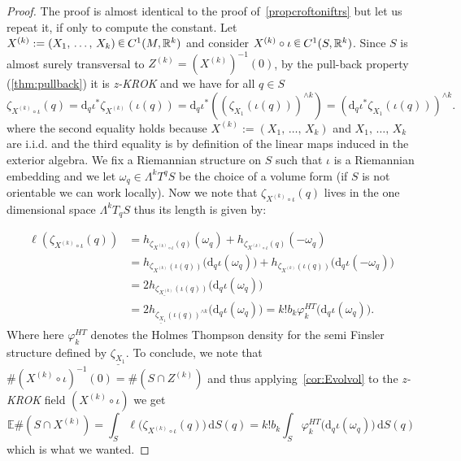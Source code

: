 \documentclass[10pt]{amsart}
\theoremstyle{definition}\newtheorem{defi}[theo]{Definition}\newtheorem{rema}[theo]{Remark}\newtheorem{exam}[theo]{Example}\newtheorem{exem}[theo]{Example}\newtheorem{nota}[theo]{Notation}
\newcommand{\R}{\mathbb{R}}
\newcommand{\EE}{\mathbb{E}}
\newcommand{\dd}{\mathrm{d}}
\newcommand{\seg}{\underline}
\newcommand{\zkrok}{\emph{z-KROK}\xspace}
\newcommand*\randin{
\mathchoice {\raisebox{-.35ex}{$\displaystyle{^\subset}$}\mkern-11.5mu\raisebox{+.45ex}{$\displaystyle{_\subset}$}} {\mkern+1mu\raisebox{-.27ex}{$\textstyle{^\subset}$}\mkern-11.7mu\raisebox{+.45ex}{$\textstyle{_\subset}$}} {\raisebox{.35ex}{$\scriptstyle\subset$}\mkern-14mu\raisebox{-.15ex}{$\scriptstyle\subset$}} {\raisebox{.3ex}{$\scriptscriptstyle\subset$}\mkern-13.5mu\raisebox{-.10ex}{$\scriptscriptstyle\subset$}}}
\begin{document}
\begin{proof}
The proof is almost identical to the proof of~\cref{propcroftoniftrs} but let us repeat it, if only to compute the constant. Let $X^{(k)}:=(X_1,\,\ldots,\,X_k)\,\randin\, C^1(M,\R^k)$ and consider $X^{(k)}\circ \iota\,\randin\, C^1(S,\R^k)$. Since $S$ is almost surely transversal to $Z^{(k)}=(X^{(k)})^{-1}(0)$, by the pull-back property (\cref{thm:pullback}) it is \zkrok and we have for all $q\in S$
\begin{equation*}
\zeta_{X^{(k)}\circ \iota}(q)=\dd_q\iota^* \zeta_{X^{(k)}}(\iota(q))=\dd_q\iota^* \left((\zeta_{X_1}(\iota(q)))^{\wedge k}\right)=\left(\dd_q\iota^* \zeta_{X_1}(\iota(q))\right)^{\wedge k}.
\end{equation*}
where the second equality holds because $X^{(k)}:=(X_1,\,\ldots,\,X_k)$ and $X_1,\,\ldots,\,X_k$ are i.i.d. and the third equality is by definition of the linear maps induced in the exterior algebra. We fix a Riemannian structure on $S$ such that $\iota$ is a Riemannian embedding and we let $\omega_q\in \Lambda^kT^qS$ be the choice of a volume form (if $S$ is not orientable we can work locally). Now we note that $\zeta_{X^{(k)}\circ \iota}(q)$ lives in the one dimensional space $\Lambda^kT_qS$ thus its length is given by:

\begin{align*}
\ell\left(\zeta_{X^{(k)}\circ\iota}(q)\right) &=h_{\zeta_{X^{(k)}\circ\iota}(q)}(\omega_q)+h_{\zeta_{X^{(k)}\circ\iota}(q)}(-\omega_q) \\
&=h_{\zeta_{X^{(k)}}(\iota(q))}\big(\dd_q\iota(\omega_q)\big)+h_{\zeta_{X^{(k)}}(\iota(q))}\big(\dd_q\iota(-\omega_q)\big) \\
&=2h_{\seg{\zeta_{X^{(k)}}}(\iota(q))}\big(\dd_q\iota(\omega_q)\big) \\
&=2h_{\seg{\zeta_{X_1}}(\iota(q))^{\wedge k}}\big(\dd_q\iota(\omega_q)\big)=k!b_k \varphi_k^{HT}\big(\dd_q\iota(\omega_q)\big).
\end{align*}
Where here $\varphi_k^{HT}$ denotes the Holmes Thompson density for the semi Finsler structure defined by $\seg{\zeta_{X_1}}$. To conclude, we note that $\#(X^{(k)}\circ\iota)^{-1}(0)=\#(S\cap Z^{(k)})$ and thus applying~\cref{cor:Evolvol} to the \zkrok field $(X^{(k)}\circ\iota)$ we get
\begin{equation*}
\EE\#\left(S\cap X^{(k)}\right)=\int_S\ell\big(\zeta_{X^{(k)}\circ\iota}(q)\big)\,\dd S(q)=k!b_k\int_S\varphi_k^{HT}\big(\dd_q\iota(\omega_q)\big)\,\dd S(q)
\end{equation*}
which is what we wanted.
\end{proof}
\end{document}
